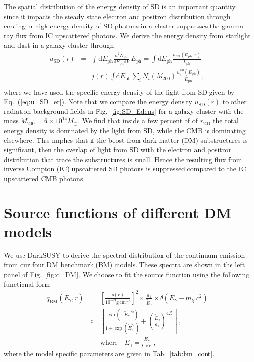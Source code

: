 \documentclass[10pt,aps,pra,reprint,amsmath,amsfonts,amssymb,showpacs,nofootinbib,floatfix]{revtex4-1}
\newcommand{\rmn}{\mathrm}
\newcommand{\ph}{\rmn{ph}}
\newcommand{\eph}{E_\ph}
\newcommand{\gal}{\rmn{gal}}
\newcommand{\sd}{\rmn{SD}}
\newcommand{\msun}{M_\odot}
\newcommand{\cm}{\rmn{cm}}
\newcommand{\egt}{\tilde{E}_\gamma}
\newcommand{\gev}{\rmn{GeV}}
\newcommand{\dd}{\rmn{d}}
\newcommand{\rvir}{r_{200}}
\newcommand{\mvir}{M_{200}}
\newcommand{\eg}{E_\gamma}
\begin{document}
The spatial distribution of the energy density of SD is an important
quantity since it impacts the steady state electron and positron
distribution through cooling; a high energy density of SD photons in
a cluster suppresses the gamma-ray flux from IC upscattered
photons. We derive the energy density from starlight and dust in a
galaxy cluster through
\begin{eqnarray}
\label{eq:u_SD_r}
u_\sd(r) &=& \int \dd \eph \frac{\dd^2 N_\ph}{\dd \eph \dd V}\,\eph
=\int \dd \eph \frac{u_\sd(\eph, r)}{\eph}
\nonumber \\
&=&  j(r)  \int \dd \eph \sum_i 
N_i(\mvir) \frac{u_i^\gal(\eph)}{\eph}\,, \nonumber \\
\end{eqnarray}
where we have used the specific energy density of the light from SD
given by Eq.~(\ref{eq:u_SD_er}). Note that we compare the energy
density $u_\sd(r)$ to other radiation background fields in
Fig.~\ref{fig:SD_Edens} for a galaxy cluster with the mass
$\mvir=6\times10^{14}\msun$. We find that inside a few percent of of
$\rvir$ the total energy density is dominated by the light from SD,
while the CMB is dominating elsewhere. This implies that if the boost
from dark matter (DM) substructures is significant, then the overlap of
light from SD with the electron and positron distribution that trace
the substructures is small. Hence the resulting flux from inverse
Compton (IC) upscattered SD photons is suppressed compared to the IC
upscattered CMB photons.


\section{Source functions of different DM models}
We use {\sc DarkSUSY} to derive the spectral distribution of the
continuum emission from our four DM benchmark (BM) models. These
spectra are shown in the left panel of Fig.~\ref{fig:q_DM}. We choose
to fit the source function using the following functional form
\begin{eqnarray}
q_\rmn{BM} (\eg,r)&=&\left[\frac{\rho(r)}{10^{-29}\rmn{g}\,\cm^{-3}}\right]^2
\times\frac{a_1}{\egt}\times\theta(\eg-m_\chi\,c^2)\nonumber\\
&\times&\left[\frac{\exp\left(-\egt^{-a_2}\right)}{1+\exp\left(\egt^{a_3}\right)}
+\left(\frac{\egt}{a_4}\right)^{4.5}\right]\,, \nonumber\\
&&\rmn{where}\quad \egt = \frac{\eg}{\gev}\,,
 \label{eq:bm_cont}
\end{eqnarray}
where the model specific parameters are given in
Tab.~\ref{tab:bm_cont}.
\end{document}
